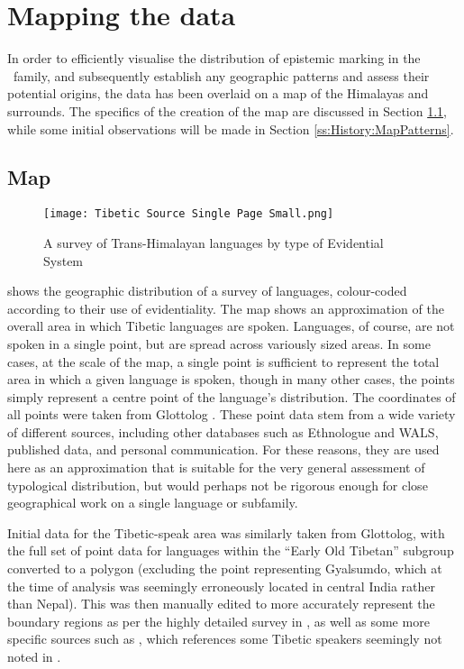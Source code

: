 \section{Mapping the data}\label{s:History:Map}
In order to efficiently visualise the distribution of epistemic marking in the \lfam\ family, and subsequently establish any geographic patterns and assess their potential origins, the data has been overlaid on a map of the Himalayas and surrounds. The specifics of the creation of the map are discussed in Section \ref{ss:History:Map}, while some initial observations will be made in Section \ref{ss:History:MapPatterns}.

\subsection{Map}\label{ss:History:Map}
\begin{figure}
    \caption{A survey of Trans-Himalayan languages by type of Evidential System}
    \centering
    \texttt{[image: Tibetic Source Single Page Small.png]}
    \label{map:EvidentialityMap}
\end{figure}
 shows the geographic distribution of a survey of languages, colour-coded according to their use of evidentiality. The map shows an approximation of the overall area in which Tibetic languages are spoken. Languages, of course, are not spoken in a single point, but are spread across variously sized areas. In some cases, at the scale of the map, a single point is sufficient to represent the total area in which a given language is spoken, though in many other cases, the points simply represent a centre point of the language's distribution. The coordinates of all points were taken from Glottolog \cite{glottolog}. These point data stem from a wide variety of different sources, including other databases such as Ethnologue and WALS, published data, and personal communication. For these reasons, they are used here as an approximation that is suitable for the very general assessment of typological distribution, but would perhaps not be rigorous enough for close geographical work on a single language or subfamily. 

Initial data for the Tibetic-speak area was similarly taken from Glottolog, with the full set of point data for languages within the ``Early Old Tibetan'' subgroup converted to a polygon (excluding the point representing Gyalsumdo, which at the time of analysis was seemingly erroneously located in central India rather than Nepal). This was then manually edited to more accurately represent the boundary regions as per the highly detailed survey in , as well as some more specific sources such as , which references some Tibetic speakers seemingly not noted in .

